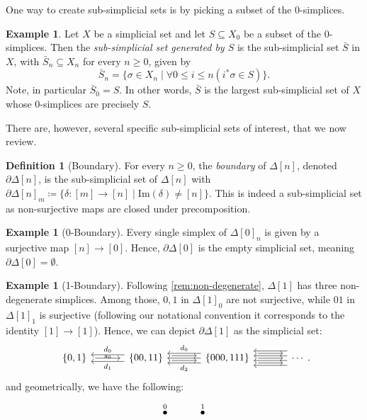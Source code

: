 \documentclass[11pt, a4paper]{amsart}
\theoremstyle{definition}
\newtheorem{definition}[equation]{Definition}
\newtheorem{example}[equation]{Example}
\theoremstyle{remark}
\numberwithin{equation}{section}
\begin{document}
One way to create sub-simplicial sets is by picking a subset of the $0$-simplices.

\begin{example} \label{ex:sub simplicial set}
  Let $X$ be a simplicial set and let $S \subseteq X_0$ be a subset of the $0$-simplices. Then the \emph{sub-simplicial set generated by $S$} is the sub-simplicial set $\bar{S}$ in $X$, with $\bar{S}_n \subseteq X_n$ for every $n \geq 0$, given by 
  \[ \bar{S}_n = \{ \sigma \in X_n \mid \forall 0 \leq i \leq n (i^*\sigma \in S)\}.\]
  Note, in particular $\bar{S}_0 = S$. In other words, $\bar{S}$ is the largest sub-simplicial set of $X$ whose $0$-simplices are precisely $S$.  
\end{example}

There are, however, several specific sub-simplicial sets of interest, that we now review.

\begin{definition}[Boundary] \label{def:boundary}
  For every $n \geq 0$, the \emph{boundary} of $\Delta[n]$, denoted $\partial \Delta[n]$, is the sub-simplicial set of $\Delta[n]$ with $\partial \Delta[n]_m \coloneq \{ \delta\colon [m] \to [n] \mid \mathrm{Im}(\delta) \neq [n] \}$. This is indeed a sub-simplicial set as non-surjective maps are closed under precomposition.
\end{definition}

\begin{example}[0-Boundary]
 Every single simplex of $\Delta[0]_n$ is given by a surjective map $[n] \to [0]$. Hence, $\partial \Delta[0]$ is the empty simplicial set, meaning $\partial \Delta[0] = \emptyset$.
\end{example}

\begin{example}[1-Boundary]
  Following \cref{rem:non-degenerate}, $\Delta[1]$ has three non-degenerate simplices. Among those, $0,1$ in $\Delta[1]_0$ are not surjective, while $01$ in $\Delta[1]_1$ is surjective (following our notational convention it corresponds to the identity $[1] \to [1]$). Hence, we can depict $\partial \Delta[1]$ as the simplicial set: 
  \[
  \begin{tikzcd}[column sep=1.2cm]
   \{0,1\} \arrow[r, shorten >=1ex,shorten <=1ex, "s_0"'  yshift= .2cm]
   & \{00,11\} 
   \arrow[l, shift left=1.4, "d_1"] \arrow[l, shift right=1.4, "d_0"'] 
   \arrow[r, shift right, shorten >=1ex,shorten <=1ex ] \arrow[r, shift left, shorten >=1ex,shorten <=1ex] 
   & \{000,111\} 
   \arrow[l] \arrow[l, shift left=2, "d_2"] \arrow[l, shift right=2, "d_0"'] 
   \arrow[r, shorten >=1ex,shorten <=1ex] \arrow[r, shift left=2, shorten >=1ex,shorten <=1ex] 
   \arrow[r, shift right=2, shorten >=1ex,shorten <=1ex]
   & \cdots 
   \arrow[l, shift right=1] \arrow[l, shift left=1] \arrow[l, shift right=3] \arrow[l, shift left=3] 
 \end{tikzcd}.
  \]
  and geometrically, we have the following:
  \[
  \begin{tikzcd} 
    \overset{0}{\bullet} & \overset{1}{\bullet}
  \end{tikzcd}
  \] 
\end{example}
\end{document}

